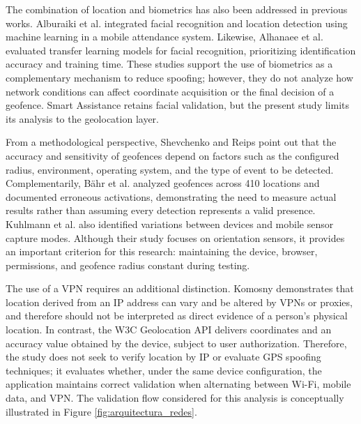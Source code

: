 \documentclass[runningheads]{llncs}
\begin{document}
The combination of location and biometrics has also been addressed in previous works. Alburaiki et al. \cite{alburaiki2021} integrated facial recognition and location detection using machine learning in a mobile attendance system. Likewise, Alhanaee et al. \cite{alhanaee2021} evaluated transfer learning models for facial recognition, prioritizing identification accuracy and training time. These studies support the use of biometrics as a complementary mechanism to reduce spoofing; however, they do not analyze how network conditions can affect coordinate acquisition or the final decision of a geofence. Smart Assistance retains facial validation, but the present study limits its analysis to the geolocation layer.

From a methodological perspective, Shevchenko and Reips \cite{shevchenko2024} point out that the accuracy and sensitivity of geofences depend on factors such as the configured radius, environment, operating system, and the type of event to be detected. Complementarily, Bähr et al. \cite{bahr2020} analyzed geofences across 410 locations and documented erroneous activations, demonstrating the need to measure actual results rather than assuming every detection represents a valid presence. Kuhlmann et al. \cite{kuhlmann2021} also identified variations between devices and mobile sensor capture modes. Although their study focuses on orientation sensors, it provides an important criterion for this research: maintaining the device, browser, permissions, and geofence radius constant during testing.

The use of a VPN requires an additional distinction. Komosny \cite{komosny2023} demonstrates that location derived from an IP address can vary and be altered by VPNs or proxies, and therefore should not be interpreted as direct evidence of a person's physical location. In contrast, the W3C Geolocation API \cite{w3c2022} delivers coordinates and an accuracy value obtained by the device, subject to user authorization. Therefore, the study does not seek to verify location by IP or evaluate GPS spoofing techniques; it evaluates whether, under the same device configuration, the application maintains correct validation when alternating between Wi-Fi, mobile data, and VPN. The validation flow considered for this analysis is conceptually illustrated in Figure \ref{fig:arquitectura_redes}.
\end{document}
